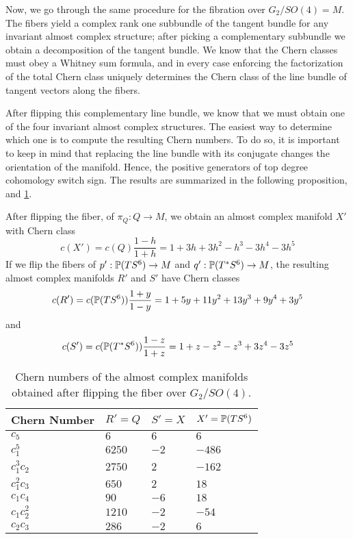 Now, we go through the same procedure for the fibration over $G_2/SO(4)=M$. The fibers yield a complex rank one subbundle of the tangent bundle for any invariant almost complex structure; after picking a complementary subbundle we obtain a decomposition of the tangent bundle. We know that the Chern classes must obey a Whitney sum formula, and in every case enforcing the factorization of the total Chern class uniquely determines the Chern class of the line bundle of tangent vectors along the fibers. 

After flipping this complementary line bundle, we know that we must obtain one of the four invariant almost complex structures. The easiest way to determine which one is to compute the resulting Chern numbers. To do so, it is important to keep in mind that replacing the line bundle with its conjugate changes the orientation of the manifold. Hence, the positive generators of top degree cohomology switch sign. The results are summarized in the following proposition, and \cref{tab:QflipMnumbers}.

\begin{prop}
	After flipping the fiber, of $\pi_Q:Q\to M$, we obtain an almost complex manifold $X'$ with Chern class
	\begin{equation*}
		c(X')=c(Q)\frac{1-h}{1+h}=1+3h+3h^2-h^3-3h^4-3h^5
	\end{equation*}
	If we flip the fibers of $p':\P(TS^6)\to M$ and $q':\P(T^*S^6)\to M$, the resulting almost complex manifolds $R'$ and $S'$ have Chern classes
	\begin{equation*}
		c(R')=c(\P(TS^6))\frac{1+y}{1-y}=1+5y+11y^2+13y^3+9y^4+3y^5
	\end{equation*}
	and
	\begin{equation*}
		c(S')=c(\P(T^*S^6))\frac{1-z}{1+z}=1+z-z^2-z^3+3z^4-3z^5
	\end{equation*}
	\proofclear
\end{prop}

\begin{table}[ht!]\centering
	\begin{tabular}{llll} \toprule
		Chern Number& $R'=Q$	& $S'=X$	& $X'=\P(TS^6)$\\ \midrule
		$c_5$ 		& $6$ 		& $6$ 		& $6$\\
		$c_1^5$ 	& $6250$	& $-2$	& $-486$\\
		$c_1^3c_2$	& $2750$ 	& $2$	& $-162$\\
		$c_1^2c_3$	& $650$ 	& $2$ 		& $18$\\
		$c_1c_4$	& $90$ 		& $-6$ 		& $18$\\
		$c_1c_2^2$	& $1210$ 	& $-2$ 	& $-54$\\
		$c_2c_3$	& $286$ 	& $-2$		& $6$\\ \bottomrule
	\end{tabular}
	\caption{Chern numbers of the almost complex manifolds obtained after flipping the fiber over $G_2/SO(4)$.}\label{tab:QflipMnumbers}
\end{table}

